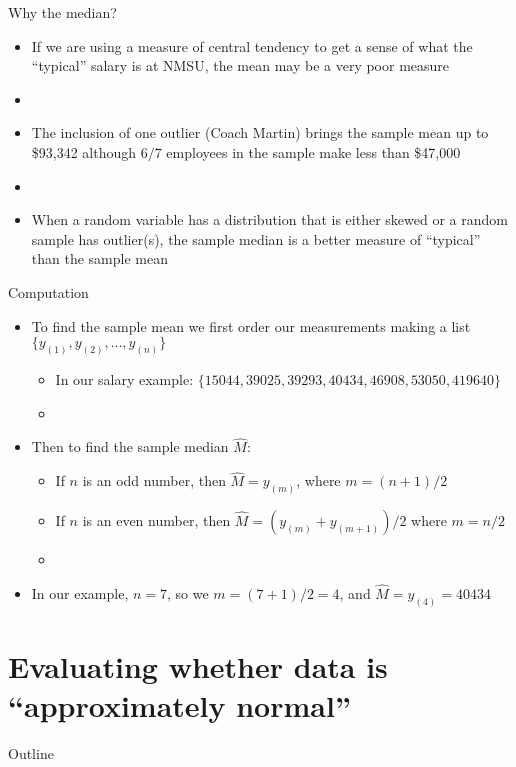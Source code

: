 \documentclass[xcolor=dvipsnames]{beamer}
\begin{document}
\begin{frame}{Why the median?}
	\begin{itemize}
		\item If we are using a measure of central tendency to get a sense of what the ``typical'' salary is at NMSU, the mean may be a very poor measure
		\item[]
		\item The inclusion of one outlier (Coach Martin) brings the sample mean up to \$93,342 although $6/7$ employees in the sample make less than \$47,000
		\item[]
		\item When a random variable has a distribution that is either skewed or a random sample has outlier(s), the sample median is a better measure of ``typical'' than the sample mean 
	\end{itemize}
\end{frame}

\begin{frame}{Computation}
	\begin{itemize}
		\item To find the sample mean we first order our measurements making a list $\{y_{(1)}, y_{(2)}, \hdots, y_{(n)} \}$
		\begin{itemize}
			\item In our salary example: $\{15044, 39025, 39293, 40434, 46908, 53050, 419640\}$
			\item[]
		\end{itemize}
		\item Then to find the sample median $\hat{M}$:
		\begin{itemize}
			\item If $n$ is an odd number, then $\hat{M} = y_{(m)}$, where $m = (n+1)/2$
			\item If $n$ is an even number, then $\hat{M} = (y_{(m)} + y_{(m+1)})/2$ where $m = n/2$
			\item[]
		\end{itemize}
		\item In our example, $n = 7$, so we $m = (7+1)/2 = 4$, and $\hat{M} = y_{(4)} = 40434$
	\end{itemize}
\end{frame}

\section{Evaluating whether data is ``approximately normal''}
\begin{frame}{Outline}
\tableofcontents[currentsection,subsectionstyle=show/shaded/hide]
\end{frame}
\end{document}
